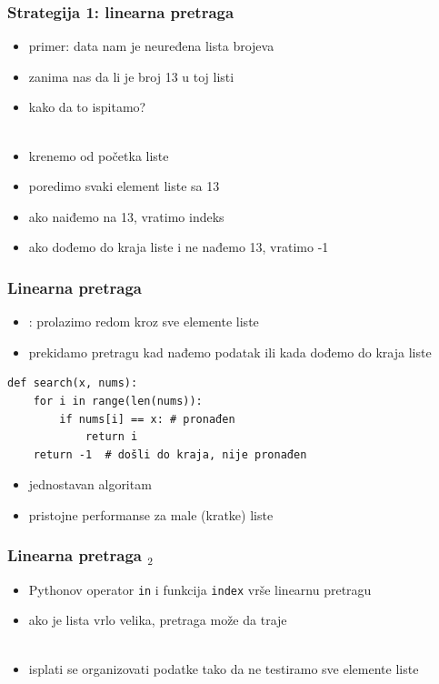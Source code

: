 \documentclass[utf8,compress]{beamer}
\begin{document}
\begin{frame}[fragile]
  \frametitle{Strategija 1: linearna pretraga}
  \begin{itemize}
    \item primer: data nam je neuređena lista brojeva
    \item zanima nas da li je broj 13 u toj listi
    \item kako da to ispitamo? \\ \ \\
    \item krenemo od početka liste
    \item poredimo svaki element liste sa 13
    \item ako naiđemo na 13, vratimo indeks
    \item ako dođemo do kraja liste i ne nađemo 13, vratimo -1
  \end{itemize}
\end{frame}

\begin{frame}[fragile]
  \frametitle{Linearna pretraga}
  \begin{itemize}
    \item {}: prolazimo redom kroz sve elemente liste
    \item prekidamo pretragu kad nađemo podatak ili kada dođemo do kraja liste
  \end{itemize}
\begin{verbatim}
def search(x, nums):
    for i in range(len(nums)):
        if nums[i] == x: # pronađen
            return i
    return -1  # došli do kraja, nije pronađen
\end{verbatim}
  \begin{itemize}
    \item jednostavan algoritam
    \item pristojne performanse za male (kratke) liste
  \end{itemize}
\end{frame}

\begin{frame}[fragile]
  \frametitle{Linearna pretraga $_2$}
  \begin{itemize}
    \item Pythonov operator \texttt{in} i funkcija \texttt{index} vrše linearnu pretragu
    \item ako je lista vrlo velika, pretraga može da traje \\ \ \\
    \item isplati se organizovati podatke tako da ne testiramo sve elemente liste
  \end{itemize}
\end{frame}
\end{document}
